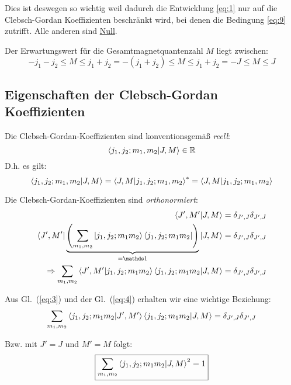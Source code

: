 Dies ist deswegen so wichtig weil dadurch die Entwicklung \eqref{eq:1} nur
auf die Clebsch-Gordan Koeffizienten beschränkt wird, bei denen die Bedingung
\eqref{eq:9} zutrifft. Alle anderen sind \underline{Null}. 

Der Erwartungswert für die Gesamtmagnetquantenzahl \(M\) liegt zwischen:
\begin{equation}
  \label{eq:11}
  -j_1-j_2\leq M \leq j_1+j_2=-(j_1+j_2)\leq M \leq j_1+j_2
  =-J\leq M \leq J
\end{equation}




\subsection*{Eigenschaften der Clebsch-Gordan Koeffizienten}
\label{sec:eigensch-der-clebsch}

Die Clebsch-Gordan-Koeffizienten sind konventionsgemäß \emph{reell}:
\begin{equation}
  \label{eq:2}
  \braket{j_1,j_2;m_1,m_2}{J,M} \in \mathbb R
\end{equation}
D.h. es gilt:
\begin{equation}
  \label{eq:3}
  \braket{j_1,j_2;m_1,m_2}{J,M} = \braket{J,M}{j_1,j_2;m_1,m_2}^*=
  \braket{J,M}{j_1,j_2;m_1,m_2}
\end{equation}

Die Clebsch-Gordan-Koeffizienten sind \emph{orthonormiert}:
\begin{align}
  \label{eq:4}
  \braket{J',M'}{J,M}&=\delta_{J',J}\delta_{J',J}\notag\\
  \bra{J',M'}\underbrace{\left(
      \sum_{m_1,m_2}\ket{j_1,j_2;m_1m_2}\bra{j_1,j_2;m_1m_2}\right)
  }_{=\mathds 1}
  \ket{J,M}&=\delta_{J',J}\delta_{J',J}\notag\\
  \Rightarrow\sum_{m_1,m_2}\braket{J',M'}{j_1,j_2;m_1m_2}
  \braket{j_1,j_2;m_1m_2}{J,M}&=\delta_{J',J}\delta_{J',J}
\end{align}

Aus Gl.~(\ref{eq:3}) und der Gl.~(\ref{eq:4}) erhalten wir eine wichtige Beziehung:
\begin{equation}
  \label{eq:5}
  \sum_{m_1,m_2}\braket{j_1,j_2;m_1m_2}{J',M'}
  \braket{j_1,j_2;m_1m_2}{J,M}=\delta_{J',J}\delta_{J',J}
\end{equation}

Bzw. mit \(J'=J\) und \(M'=M\) folgt:
\begin{equation}
  \label{eq:6}
  \boxed{\sum_{m_1,m_2}\braket{j_1,j_2;m_1m_2}{J,M}^2=1}
\end{equation}


